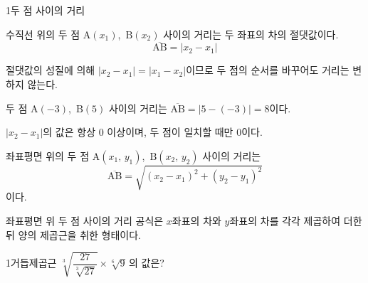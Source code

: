 \documentclass[10pt]{article}
\begin{document}

\begin{dmconcept}{1}{두 점 사이의 거리}


수직선 위의 두 점 $\mathrm{A}(x_1)$,\ $\mathrm{B}(x_2)$ 사이의 거리는 두 좌표의 차의 절댓값이다.
\begin{equation*}
  \overline{\mathrm{AB}} = |x_2 - x_1|
\end{equation*}

절댓값의 성질에 의해 $|x_2 - x_1| = |x_1 - x_2|$이므로 두 점의 순서를 바꾸어도 거리는 변하지 않는다.

\begin{dmexample}
두 점 $\mathrm{A}(-3)$,\ $\mathrm{B}(5)$ 사이의 거리는 $\overline{\mathrm{AB}} = |5 - (-3)| = 8$이다.
\end{dmexample}

\begin{dmnote}
$|x_2 - x_1|$의 값은 항상 $0$ 이상이며, 두 점이 일치할 때만 $0$이다.
\end{dmnote}


좌표평면 위의 두 점 $\mathrm{A}(x_1,\, y_1)$,\ $\mathrm{B}(x_2,\, y_2)$ 사이의 거리는
\begin{equation*}
  \overline{\mathrm{AB}} = \sqrt{(x_2 - x_1)^2 + (y_2 - y_1)^2}
\end{equation*}
이다.

\begin{dmexplain}
좌표평면 위 두 점 사이의 거리 공식은 $x$좌표의 차와 $y$좌표의 차를 각각 제곱하여 더한 뒤 양의 제곱근을 취한 형태이다.
\end{dmexplain}

\end{dmconcept}

\newpage

\begin{dmssexbox}{1}{거듭제곱근}
$\displaystyle\sqrt[3]{\dfrac{27}{\sqrt[3]{27}}} \times \sqrt[6]{9}$\,의 값은?
\par\vspace{2mm}
\noindent{}%
%
%
%
\end{dmssexbox}
\end{document}
